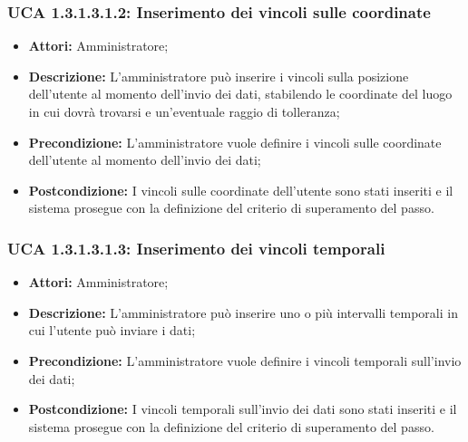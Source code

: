 \hypertarget{A1.3.1.3.1.2}{}
\subsubsection{UCA 1.3.1.3.1.2: Inserimento dei vincoli sulle coordinate}
\begin{itemize}
\item \textbf{Attori:}
Amministratore;
\item \textbf{Descrizione:}
L'amministratore può inserire i vincoli sulla posizione dell'utente al momento dell'invio dei dati, stabilendo le coordinate del luogo in cui dovrà trovarsi e un'eventuale raggio di tolleranza;
\item \textbf{Precondizione:}
L'amministratore vuole definire i vincoli sulle coordinate dell'utente al momento dell'invio dei dati;
\item \textbf{Postcondizione:}
I vincoli sulle coordinate dell'utente sono stati inseriti e il sistema prosegue con la definizione del criterio di superamento del passo.
\end{itemize}

\hypertarget{A1.3.1.3.1.3}{}
\subsubsection{UCA 1.3.1.3.1.3: Inserimento dei vincoli temporali}
\begin{itemize}
\item \textbf{Attori:}
Amministratore;
\item \textbf{Descrizione:}
L'amministratore può inserire uno o più intervalli temporali in cui l'utente può inviare i dati;
\item \textbf{Precondizione:}
L'amministratore vuole definire i vincoli temporali sull'invio dei dati;
\item \textbf{Postcondizione:}
I vincoli temporali sull'invio dei dati sono stati inseriti e il sistema prosegue con la definizione del criterio di superamento del passo.
\end{itemize}

\hypertarget{A1.3.1.3.1.4}{}
